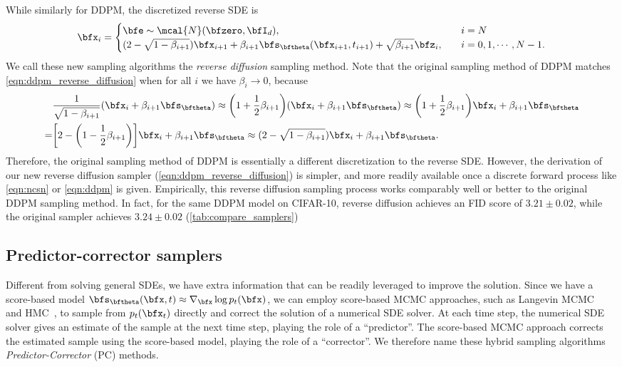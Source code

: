 While similarly for DDPM, the discretized reverse SDE is
\begin{align}
    \bfx_i = \begin{cases}
        \bfe \sim \mcal{N}(\bfzero, \bfI_d), &\quad i = N\label{eqn:ddpm_reverse_diffusion}\\
        (2 - \sqrt{1-\beta_{i+1}})\bfx_{i+1} + \beta_{i+1} \bfs_\bftheta(\bfx_{i+1}, t_{i+1}) + \sqrt{\beta_{i+1}}\bfz_i,&\quad i=0,1,\cdots,N-1.
    \end{cases}
\end{align}
We call these new sampling algorithms the \emph{reverse diffusion} sampling method. Note that the original sampling method of DDPM matches \cref{eqn:ddpm_reverse_diffusion} when for all $i$ we have $\beta_i \to 0$, because
\begin{align*}
    &\frac{1}{\sqrt{1-\beta_{i+1}}}(\bfx_i + \beta_{i+1} \bfs_\bftheta) \approx \bigg( 1 + \frac{1}{2}\beta_{i+1} \bigg)(\bfx_i + \beta_{i+1} \bfs_\bftheta) \approx \bigg(1 + \frac{1}{2}\beta_{i+1} \bigg) \bfx_{i} + \beta_{i+1}\bfs_\bftheta \\
    =& \bigg[2 - \bigg(1 - \frac{1}{2}\beta_{i+1}\bigg) \bigg] \bfx_{i} + \beta_{i+1}\bfs_\bftheta \approx (2 - \sqrt{1-\beta_{i+1}})\bfx_{i} + \beta_{i+1}\bfs_\bftheta.
\end{align*}
Therefore, the original sampling method of DDPM is essentially a different discretization to the reverse SDE. However, the derivation of our new reverse diffusion sampler (\cref{eqn:ddpm_reverse_diffusion}) is simpler, and more readily available once a discrete forward process like \cref{eqn:ncsn} or \cref{eqn:ddpm} is given. Empirically, this reverse diffusion sampling process works comparably well or better to the original DDPM sampling method. In fact, for the same DDPM model on CIFAR-10, reverse diffusion achieves an FID score of $3.21\pm 0.02$, while the original sampler achieves $3.24\pm 0.02$ (\cref{tab:compare_samplers})

\subsection{Predictor-corrector samplers}
Different from solving general SDEs, we have extra information that can be readily leveraged to improve the solution. Since we have a score-based model $\bfs_\bftheta(\bfx, t) \approx \nabla_\bfx \log p_t(\bfx)$, we can employ score-based MCMC approaches, such as Langevin MCMC~\citep{parisi1981correlation,grenander1994representations} and HMC~\citep{neal2011mcmc}, to sample from $p_t(\bfx_t)$ directly and correct the solution of a numerical SDE solver. At each time step, the numerical SDE solver gives an estimate of the sample at the next time step, playing the role of a ``predictor''. The score-based MCMC approach corrects the estimated sample using the score-based model, playing the role of a ``corrector''. We therefore name these hybrid sampling algorithms \emph{Predictor-Corrector} (PC) methods.

